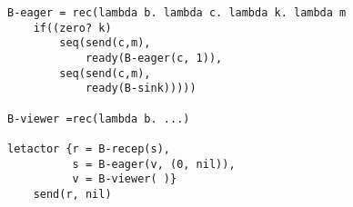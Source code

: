 \documentclass{article}
\begin{document}
\begin{enumerate}
\begin{enumerate}
\begin{verbatim}
B-eager = rec(lambda b. lambda c. lambda k. lambda m
    if((zero? k)
        seq(send(c,m),
            ready(B-eager(c, 1)),
        seq(send(c,m),
            ready(B-sink)))))

B-viewer =rec(lambda b. ...)

letactor {r = B-recep(s),
          s = B-eager(v, (0, nil)),
          v = B-viewer( )}
    send(r, nil)
\end{verbatim}

\end{enumerate}

\end{enumerate}
\end{document}
